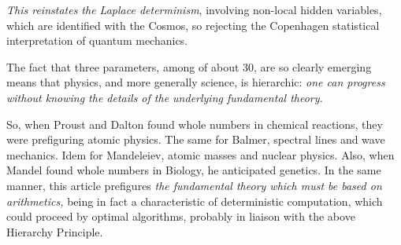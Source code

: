 \documentclass[twoside,draft]{article}
\begin{document}
\begin{sloppypar}
\textit{This reinstates the Laplace determinism}, involving non-local hidden variables, which are identified with the Cosmos, so rejecting the Copenhagen statistical interpretation of quantum mechanics.

The fact that three parameters, among of about 30, are so clearly emerging means that physics, and more generally science, is hierarchic: \textit{one can progress without knowing the details of the underlying fundamental theory.}

So, when Proust and Dalton found whole numbers in chemical reactions, they were prefiguring atomic physics. The same for Balmer, spectral lines and wave mechanics. Idem for Mandeleiev, atomic masses and nuclear physics. Also, when Mandel found whole numbers in Biology, he anticipated genetics. In the same manner, this article prefigures \textit{the fundamental theory which must be based on arithmetics,} being in fact a characteristic of deterministic computation, which could proceed by optimal algorithms, probably in liaison with the above Hierarchy Principle.







\end{sloppypar}
\end{document}

